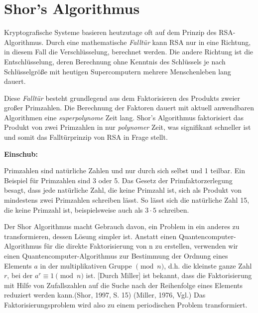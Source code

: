 \section{Shor's Algorithmus}\newline

	Kryptografische Systeme basieren heutzutage oft auf dem Prinzip des RSA-Algorithmus. Durch eine mathematische \textit{Falltür} kann RSA nur in eine Richtung, in diesem Fall die Verschlüsselung, berechnet werden. Die andere Richtung ist die Entschlüsselung, deren Berechnung ohne Kenntnis des Schlüssels je nach Schlüsselgröße mit heutigen Supercomputern mehrere Menschenleben lang dauert. 


	Diese \textit{Falltür} besteht grundlegend aus dem Faktorisieren des Produkts zweier großer Primzahlen. Die Berechnung der Faktoren dauert mit aktuell anwendbaren Algorithmen eine \textit{superpolynome} Zeit lang.
	Shor's Algorithmus faktorisiert das Produkt von zwei Primzahlen in nur \textit{polynomer} Zeit, was signifikant schneller ist und somit das Falltürprinzip von RSA in Frage stellt.
	\newline\newline
    

	\hr
    \textbf{Einschub:}

   
        Primzahlen sind natürliche Zahlen und nur durch sich selbst und 1 teilbar. Ein Beispiel für Primzahlen sind 3 oder 5. Das Gesetz der Primfaktorzerlegung besagt, dass jede natürliche Zahl, die keine Primzahl ist, sich als Produkt von mindestens zwei Primzahlen schreiben lässt. So lässt sich die natürliche Zahl 15, die keine Primzahl ist, beispielsweise auch als \(3\cdot 5\) schreiben.
   \newline 
   \hr
	\newline

	Der Shor Algorithmus macht Gebrauch davon, ein Problem in ein anderes zu transformieren, dessen Lösung simpler ist. \glqq Anstatt einen Quantencomputer-Algorithmus für die direkte Faktorisierung von n zu erstellen, verwenden wir einen Quantencomputer-Algorithmus zur Bestimmung der Ordnung eines Elements \(a\) in der multiplikativen Gruppe \(\pmod{n}\), d.h. die kleinste ganze Zahl \(r\), bei der \(a^r \equiv 1 \pmod{n} \) ist. [Durch Miller] ist bekannt, dass die Faktorisierung mit Hilfe von Zufallszahlen auf die Suche nach der Reihenfolge eines Elements reduziert werden kann.\grqq (Shor, 1997, S. 15) (Miller, 1976, Vgl.) Das Faktorisierungsproblem wird also zu einem periodischen Problem transformiert.

